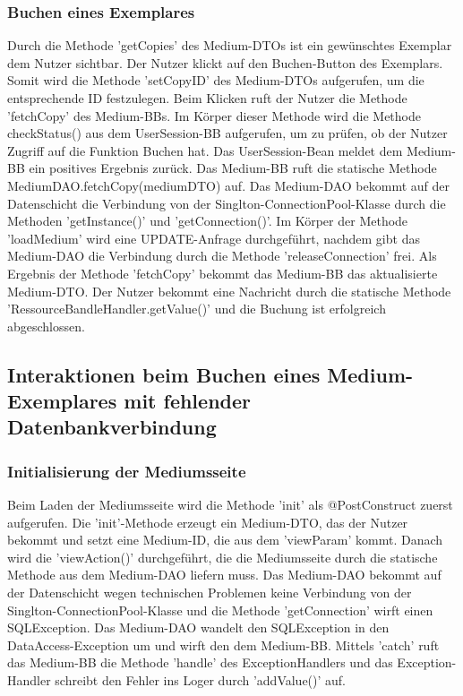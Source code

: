 \documentclass{article}
\begin{document}
\subsubsection{Buchen eines Exemplares}
Durch die Methode 'getCopies' des Medium-DTOs ist ein gewünschtes Exemplar dem Nutzer sichtbar. Der Nutzer klickt auf den Buchen-Button des Exemplars. Somit wird die Methode 'setCopyID' des Medium-DTOs aufgerufen, um die entsprechende ID festzulegen. Beim Klicken ruft der Nutzer die Methode 'fetchCopy' des Medium-BBs. Im Körper dieser Methode wird die Methode checkStatus() aus dem UserSession-BB aufgerufen, um zu prüfen, ob der Nutzer Zugriff auf die Funktion Buchen hat. Das UserSession-Bean meldet dem Medium-BB ein positives Ergebnis zurück. Das Medium-BB ruft die statische Methode MediumDAO.fetchCopy(mediumDTO) auf. Das Medium-DAO bekommt auf der Datenschicht die Verbindung von der Singlton-ConnectionPool-Klasse durch die Methoden 'getInstance()' und 'getConnection()'. Im Körper der Methode 'loadMedium' wird eine UPDATE-Anfrage durchgeführt, nachdem gibt das Medium-DAO die Verbindung durch die Methode 'releaseConnection' frei. Als Ergebnis der Methode 'fetchCopy' bekommt das Medium-BB das aktualisierte Medium-DTO. Der Nutzer bekommt eine Nachricht durch die statische Methode 'RessourceBandleHandler.getValue()' und die Buchung ist erfolgreich abgeschlossen.
\subsection{Interaktionen beim Buchen eines Medium-Exemplares mit fehlender Datenbankverbindung}
\subsubsection{Initialisierung der Mediumsseite}
Beim Laden der Mediumsseite wird die Methode 'init' als @PostConstruct zuerst aufgerufen. Die 'init'-Methode erzeugt ein Medium-DTO, das der Nutzer bekommt und setzt eine Medium-ID, die aus dem 'viewParam' kommt. Danach wird die 'viewAction()' durchgeführt, die die Mediumsseite durch die statische Methode aus dem Medium-DAO liefern muss. Das Medium-DAO bekommt auf der Datenschicht wegen technischen Problemen keine Verbindung von der Singlton-ConnectionPool-Klasse und die Methode 'getConnection' wirft einen SQLException. Das Medium-DAO wandelt den SQLException in den DataAccess-Exception um und wirft den dem Medium-BB. Mittels 'catch' ruft das Medium-BB die Methode 'handle' des ExceptionHandlers und das Exception-Handler schreibt den Fehler ins Loger durch 'addValue()' auf.
\end{document}
